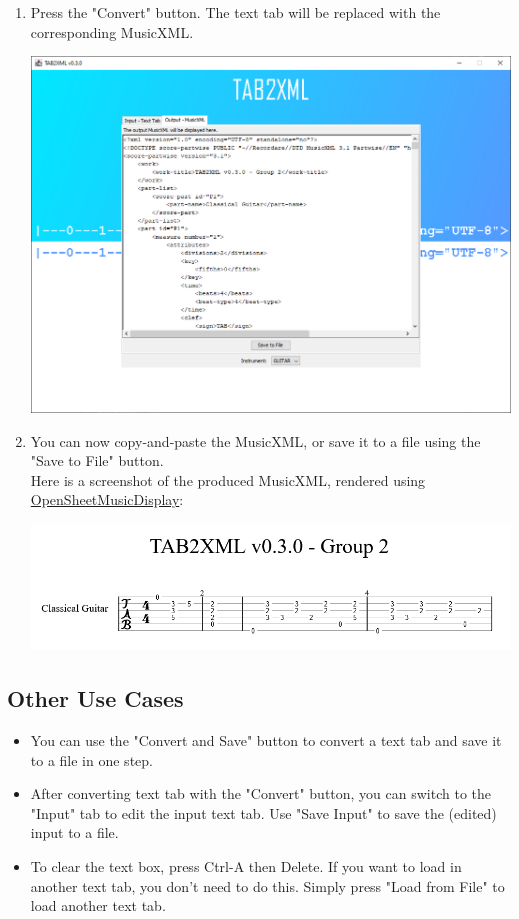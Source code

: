 \documentclass[11pt]{article}
\begin{document}
\begin{enumerate}
\begin{center}
\end{center}
\item Press the "Convert" button.  The text tab will be replaced with the corresponding MusicXML.
\begin{center}
\includegraphics[width=.9\linewidth]{../Screenshots/converted-20210317-tabbedview.png}
\end{center}
\item You can now copy-and-paste the MusicXML, or save it to a file using the "Save to File" button. \\
Here is a screenshot of the produced MusicXML, rendered using \href{https://opensheetmusicdisplay.github.io/demo/}{OpenSheetMusicDisplay}:
\begin{center}
\includegraphics[width=.9\linewidth]{../Screenshots/converted-20210317-opensheetmusicdisplay.png}
\end{center}
\end{enumerate}
\subsection{Other Use Cases}
\label{sec:org48eab6e}
\begin{itemize}
\item You can use the "Convert and Save" button to convert a text tab and save it to a file in one step.
\item After converting text tab with the "Convert" button, you can switch to the "Input" tab to edit the input text tab.  Use "Save Input" to save the (edited) input to a file.
\item To clear the text box, press Ctrl-A then Delete.  If you want to load in another text tab, you don't need to do this.  Simply press "Load from File" to load another text tab.
\end{itemize}
\end{document}
